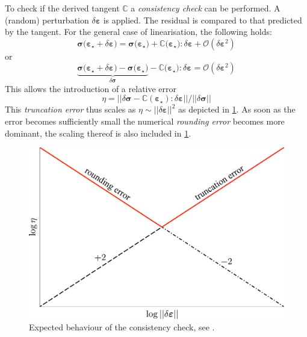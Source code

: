 \documentclass[namecite, fleqn]{goose-article}
\begin{document}
To check if the derived tangent $\mathbb{C}$ a \emph{consistency check} can be performed.
A (random) perturbation $\delta \bm{\varepsilon}$ is applied.
The residual is compared to that predicted by the tangent.
For the general case of linearisation, the following holds:
\begin{equation}
    \bm{\sigma}\big( \bm{\varepsilon}_\star + \delta \bm{\varepsilon} \big)
    = \bm{\sigma}\big( \bm{\varepsilon}_\star \big)
    + \mathbb{C} \big( \bm{\varepsilon}_\star \big) : \delta \bm{\varepsilon}
    + \mathcal{O}(\delta \bm{\varepsilon}^2)
\end{equation}
or
\begin{equation}
    \underbrace{
        \bm{\sigma}\big( \bm{\varepsilon}_\star + \delta \bm{\varepsilon} \big)
        - \bm{\sigma}\big( \bm{\varepsilon}_\star \big)
    }_{
        \displaystyle \delta \bm{\sigma}
    }
    - \mathbb{C} \big( \bm{\varepsilon}_\star \big) : \delta \bm{\varepsilon}
    = \mathcal{O}(\delta \bm{\varepsilon}^2)
\end{equation}
This allows the introduction of a relative error
\begin{equation}
    \eta =
    \Big|\Big|
        \delta \bm{\sigma}
        - \mathbb{C}(\bm{\varepsilon}_\star) : \delta \bm{\varepsilon}
    \Big|\Big|
    /
    \Big|\Big| \delta \bm{\sigma} \Big|\Big|
\end{equation}
This \emph{truncation error} thus scales as $\eta \sim || \delta \bm{\varepsilon} ||^2$
as depicted in \cref{fig:consistency:expected}.
As soon as the error becomes sufficiently small the numerical \emph{rounding error}
becomes more dominant, the scaling thereof is also included in \cref{fig:consistency:expected}.

\begin{figure}[htp]
    \centering
    \includegraphics[width=.5\textwidth]{figures/consistency}
    \caption{Expected behaviour of the consistency check, see \citet[p.~9]{Heath2002}.}
    \label{fig:consistency:expected}
\end{figure}
\end{document}
